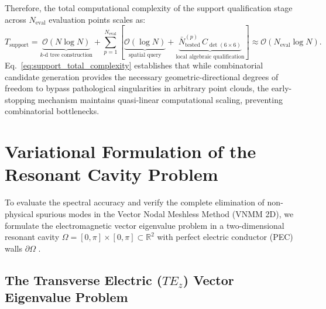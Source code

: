 \documentclass[preprint,12pt]{elsarticle}
\begin{document}
Therefore, the total computational complexity of the support qualification stage across $N_{\mathrm{eval}}$ evaluation points scales as:
\begin{equation}
T_{\mathrm{support}} = \underbrace{\mathcal{O}(N \log N)}_{\text{$k$-d tree construction}} + \sum_{p=1}^{N_{\mathrm{eval}}} \left[ \underbrace{\mathcal{O}(\log N)}_{\text{spatial query}} + \underbrace{\bar{N}_{\mathrm{tested}}^{(p)} \, C_{\det(6 \times 6)}}_{\text{local algebraic qualification}} \right] \approx \mathcal{O}(N_{\mathrm{eval}} \log N).
\label{eq:support_total_complexity}
\end{equation}
Eq.~\eqref{eq:support_total_complexity} establishes that while combinatorial candidate generation provides the necessary geometric-directional degrees of freedom to bypass pathological singularities in arbitrary point clouds, the early-stopping mechanism maintains quasi-linear computational scaling, preventing combinatorial bottlenecks.


\section{Variational Formulation of the Resonant Cavity Problem}
\label{sec:variational_formulation}

To evaluate the spectral accuracy and verify the complete elimination of non-physical spurious modes in the Vector Nodal Meshless Method (VNMM 2D), we formulate the electromagnetic vector eigenvalue problem in a two-dimensional resonant cavity $\Omega = [0, \pi] \times [0, \pi] \subset \mathbb{R}^2$ with perfect electric conductor (PEC) walls $\partial\Omega$ \cite{harrington2001time}.

\subsection{The Transverse Electric ($TE_z$) Vector Eigenvalue Problem}
\label{subsec:strong_form}
\end{document}
